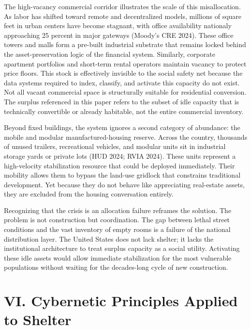 \documentclass[
  12pt,
]{article}
\begin{document}
The high-vacancy commercial corridor illustrates the scale of this misallocation. As labor has shifted toward remote and decentralized models, millions of square feet in urban centers have become stagnant, with office availability nationaly approaching 25 percent in major gateways (Moody's CRE 2024). These office towers and malls form a pre-built industrial substrate that remains locked behind the asset-preservation logic of the financial system. Similarly, corporate apartment portfolios and short-term rental operators maintain vacancy to protect price floors. This stock is effectively invisible to the social safety net because the data systems required to index, classify, and activate this capacity do not exist. Not all vacant commercial space is structurally suitable for residential conversion. The surplus referenced in this paper refers to the subset of idle capacity that is technically convertible or already habitable, not the entire commercial inventory.

Beyond fixed buildings, the system ignores a second category of abundance: the mobile and modular manufactured-housing reserve. Across the country, thousands of unused trailers, recreational vehicles, and modular units sit in industrial storage yards or private lots (HUD 2024; RVIA 2024). These units represent a high-velocity stabilization resource that could be deployed immediately. Their mobility allows them to bypass the land-use gridlock that constrains traditional development. Yet because they do not behave like appreciating real-estate assets, they are excluded from the housing conversation entirely.

Recognizing that the crisis is an allocation failure reframes the solution. The problem is not construction but coordination. The gap between lethal street conditions and the vast inventory of empty rooms is a failure of the national distribution layer. The United States does not lack shelter; it lacks the institutional architecture to treat surplus capacity as a social utility. Activating these idle assets would allow immediate stabilization for the most vulnerable populations without waiting for the decades-long cycle of new construction.

\hypertarget{vi.-cybernetic-principles-applied-to-shelter}{%
\section{VI. Cybernetic Principles Applied to Shelter}\label{vi.-cybernetic-principles-applied-to-shelter}}
\end{document}
